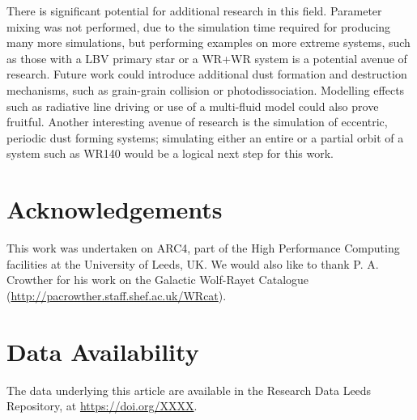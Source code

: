 \documentclass[fleqn,usenatbib]{mnras}
\begin{document}
There is significant potential for additional research in this field.
Parameter mixing was not performed, due to the simulation time required for producing many more simulations, but performing examples on more extreme systems, such as those with a LBV primary star or a WR+WR system is a potential avenue of research.
Future work could introduce additional dust formation and destruction mechanisms, such as grain-grain collision or photodissociation.
Modelling effects such as radiative line driving or use of a multi-fluid model could also prove fruitful. 
Another interesting avenue of research is the simulation of eccentric, periodic dust forming systems; simulating either an entire or a partial orbit of a system such as WR140 would be a logical next step for this work.

\section*{Acknowledgements}

This work was undertaken on ARC4, part of the High Performance Computing facilities at the University of Leeds, UK.
We would also like to thank P. A. Crowther for his work on the Galactic Wolf-Rayet Catalogue (\url{http://pacrowther.staff.shef.ac.uk/WRcat}).

\section*{Data Availability}
The data underlying this article are available in the Research Data Leeds Repository, at \url{https://doi.org/XXXX}.




\bsp	%
\label{lastpage}
\end{document}
